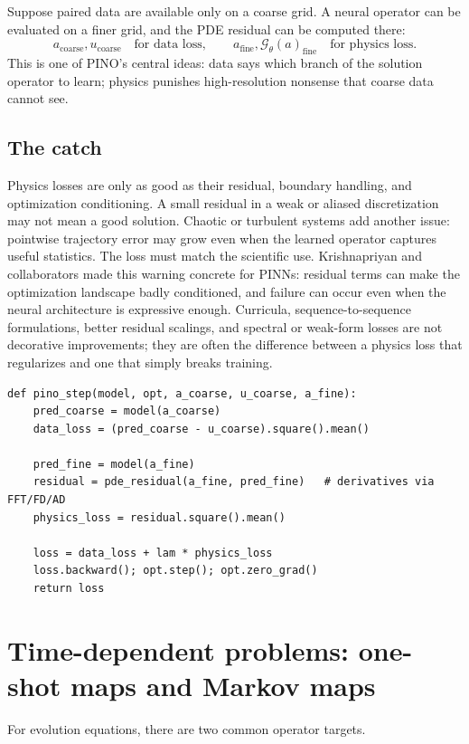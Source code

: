 \documentclass[10pt,a4paper]{article}
\newcommand{\G}{\mathcal{G}}
\begin{document}
Suppose paired data are available only on a coarse grid. A neural operator can
be evaluated on a finer grid, and the PDE residual can be computed there:
\[
  a_{\mathrm{coarse}}, u_{\mathrm{coarse}}
  \quad \text{for data loss}, \qquad
  a_{\mathrm{fine}}, \G_\theta(a)_{\mathrm{fine}}
  \quad \text{for physics loss}.
\]
This is one of PINO's central ideas: data says which branch of the solution
operator to learn; physics punishes high-resolution nonsense that coarse data
cannot see.

\subsection{The catch}

Physics losses are only as good as their residual, boundary handling, and
optimization conditioning. A small residual in a weak or aliased
discretization may not mean a good solution. Chaotic or turbulent systems add
another issue: pointwise trajectory error may grow even when the learned
operator captures useful statistics. The loss must match the scientific use.
Krishnapriyan and collaborators made this warning concrete for PINNs:
residual terms can make the optimization landscape badly conditioned, and
failure can occur even when the neural architecture is expressive enough.
Curricula, sequence-to-sequence formulations, better residual scalings, and
spectral or weak-form losses are not decorative improvements; they are often
the difference between a physics loss that regularizes and one that simply
breaks training.

\begin{lstlisting}
def pino_step(model, opt, a_coarse, u_coarse, a_fine):
    pred_coarse = model(a_coarse)
    data_loss = (pred_coarse - u_coarse).square().mean()

    pred_fine = model(a_fine)
    residual = pde_residual(a_fine, pred_fine)   # derivatives via FFT/FD/AD
    physics_loss = residual.square().mean()

    loss = data_loss + lam * physics_loss
    loss.backward(); opt.step(); opt.zero_grad()
    return loss
\end{lstlisting}

\section{Time-dependent problems: one-shot maps and Markov maps}
\label{sec:time}

For evolution equations, there are two common operator targets.
\end{document}
